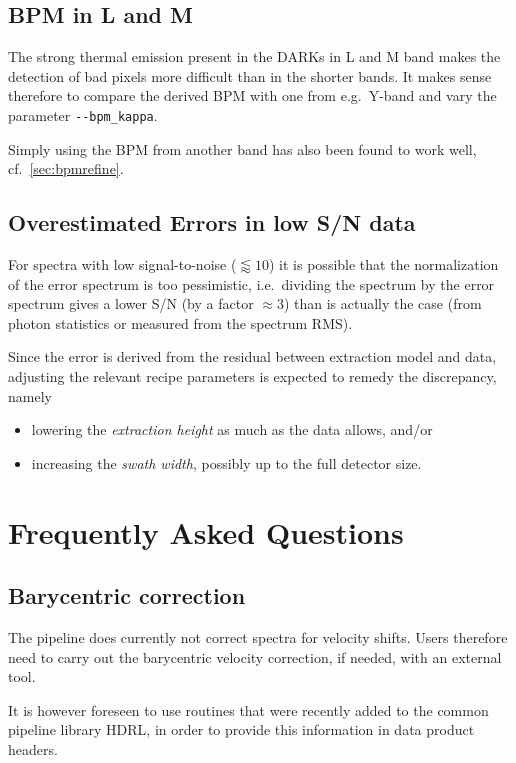 \subsection{BPM in L and M}

The strong thermal emission present in the DARKs in L and M band makes the
detection of bad pixels more difficult than in the shorter bands. It makes sense
therefore to compare the derived BPM with one from e.g.~Y-band and vary the
parameter \verb!--bpm_kappa!.

Simply using the BPM from another band has also been found to work well, cf.~\ref*{sec:bpmrefine}.

\subsection{Overestimated Errors in low S/N data}

For spectra with low signal-to-noise ($\lessapprox  10$) it is possible that the
normalization of the error spectrum is too pessimistic, i.e.~dividing the
spectrum by the error spectrum gives a lower S/N (by a factor $\approx 3$) than
is actually the case (from photon statistics or measured from the spectrum RMS).

Since the error is derived from the residual between extraction model and data, adjusting the relevant recipe parameters is expected to remedy the discrepancy, namely
\begin{itemize}
    \item lowering the \emph{extraction height} as much as the data allows, and/or
    \item increasing the \emph{swath width}, possibly up to the full detector size.
\end{itemize}

\section{Frequently Asked Questions}

\subsection{Barycentric correction}
The pipeline does currently not correct spectra for velocity shifts. Users therefore need to carry out the barycentric velocity correction, if needed, with an external tool.

It is however foreseen to use routines that were recently added to the
common pipeline library HDRL, in order to provide this information in 
data product headers.

